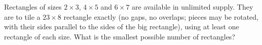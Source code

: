 Rectangles of sizes $2\times3$, $4\times5$ and $6\times7$ are available in unlimited supply. They are to tile a $23\times8$ rectangle exactly (no gaps, no overlaps; pieces may be rotated, with their sides parallel to the sides of the big rectangle), using at least one rectangle of each size. What is the smallest possible number of rectangles?
